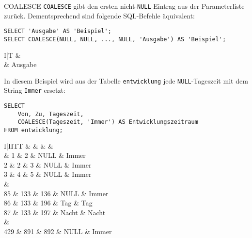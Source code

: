 \begin{sql}{COALESCE}
    \texttt{COALESCE} gibt den ersten nicht-\texttt{NULL} Eintrag aus der Parameterliste zurück.
    Dementsprechend sind folgende SQL-Befehle äquivalent:

    \begin{verbatim}
SELECT 'Ausgabe' AS 'Beispiel';
SELECT COALESCE(NULL, NULL, ..., NULL, 'Ausgabe') AS 'Beispiel';
    \end{verbatim}

    \begin{tabular}{I|T}
        &  \\ & Ausgabe \\
    \end{tabular}

    In diesem Beispiel wird aus der Tabelle \texttt{entwicklung} jede \texttt{NULL}-Tageszeit mit dem String \texttt{Immer} ersetzt:

    \begin{verbatim}
SELECT
    Von, Zu, Tageszeit,
    COALESCE(Tageszeit, 'Immer') AS Entwicklungszeitraum
FROM entwicklung;
    \end{verbatim}

    \begin{tabular}{I|IITT}
        &  &  &  &  \\ & 1 & 2 & NULL & Immer \\
        2 & 2 & 3 & NULL & Immer \\
        3 & 4 & 5 & NULL & Immer \\
         &  \\
        85 & 133 & 136 & NULL & Immer \\
        86 & 133 & 196 & Tag & Tag \\
        87 & 133 & 197 & Nacht & Nacht \\
         &  \\
        429 & 891 & 892 & NULL & Immer \\
    \end{tabular}
\end{sql}

